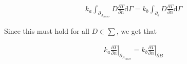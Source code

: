 \begin{gather*}
k_a\int_{\partial_{A_{inner}}}D\frac{\partial T}{\partial n} \mathrm{d}\Gamma = k_b\int_{\partial_{b}}D\frac{\partial T}{\partial n} \mathrm{d}\Gamma
\end{gather*}

Since this must hold for all $D \in \sum$, we get that

\begin{gather*}
\left.k_a\frac{\partial T}{\partial n}\right|_{\partial_{A_{inner}}} = \left.k_b\frac{\partial T}{\partial n}\right|_{\partial B}
\end{gather*}

%

